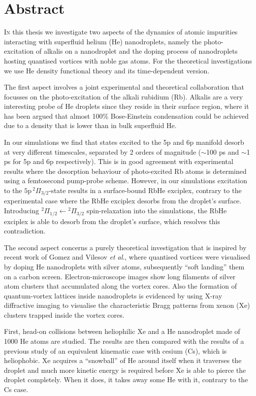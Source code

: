 \chapter{Abstract}
	\lettrine[lines=4]{\color{activeColor}I}{n} this thesis we investigate two aspects of the dynamics of atomic impurities interacting with superfluid helium (He) nanodroplets, namely the photo-excitation of alkalis on a nanodroplet and the doping process of nanodroplets hosting quantised vortices with noble gas atoms. For the theoretical investigations we use He density functional theory and its time-dependent version.

	The first aspect involves a joint experimental and theoretical collaboration that focusses on the photo-excitation of the alkali rubidium (Rb). Alkalis are a very interesting probe of He droplets since they reside in their surface region, where it has been argued that almost 100\% Bose-Einstein condensation could be achieved due to a density that is lower than in bulk superfluid He.

	In our simulations we find that states excited to the 5p and 6p manifold desorb at very different timescales, separated by 2 orders of magnitude ($\sim$100 ps and $\sim$1 ps for 5p and 6p respectively). This is in good agreement with experimental results where the desorption behaviour of photo-excited Rb atoms is determined using a femtosecond pump-probe scheme. However, in our simulations excitation to the $5\mathrm{p}\,^2\Pi_{3/2}$-state results in a surface-bound RbHe exciplex, contrary to the experimental case where the RbHe exciplex desorbs from the droplet's surface. Introducing $^2\Pi_{1/2}\leftarrow{^2}\Pi_{3/2}$ spin-relaxation into the simulations, the RbHe exciplex is able to desorb from the droplet's surface, which resolves this contradiction.

	The second aspect concerns a purely theoretical investigation that is inspired by recent work of Gomez and Vilesov \emph{et al}., where quantised vortices were visualised by doping He nanodroplets with silver atoms, subsequently ``soft landing'' them on a carbon screen. Electron-microscope images show long filaments of silver atom clusters that accumulated along the vortex cores. Also the formation of quantum-vortex lattices inside nanodroplets is evidenced by using X-ray diffractive imaging to visualise the characteristic Bragg patterns from xenon (Xe) clusters trapped inside the vortex cores.

	First, head-on collisions between heliophilic Xe and a He nanodroplet made of 1000 He atoms are studied. The results are then compared with the results of a previous study of an equivalent kinematic case with cesium (Cs), which is heliophobic. Xe acquires a ``snowball'' of He around itself when it traverses the droplet and much more kinetic energy is required before Xe is able to pierce the droplet completely. When it does, it takes away some He with it, contrary to the Cs case.

